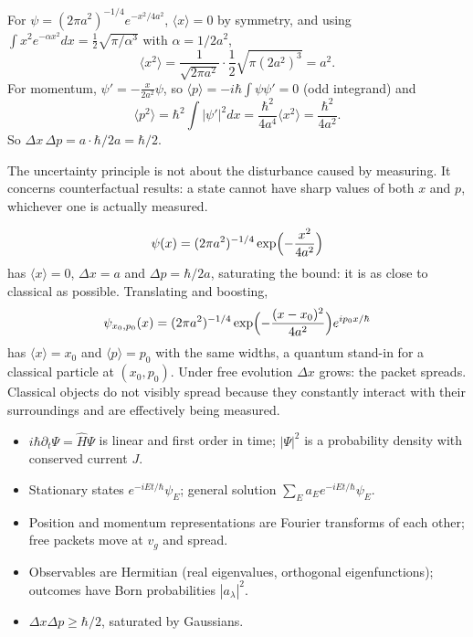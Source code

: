 \begin{example}
For $\psi = (2\pi a^2)^{-1/4}e^{-x^2/4a^2}$, $\langle x\rangle = 0$ by symmetry, and using $\int x^2e^{-\alpha x^2}dx = \frac12\sqrt{\pi/\alpha^3}$ with $\alpha = 1/2a^2$,
\[
    \langle x^2\rangle = \frac{1}{\sqrt{2\pi a^2}}\cdot\frac12\sqrt{\pi(2a^2)^3} = a^2 .
\]
For momentum, $\psi' = -\frac{x}{2a^2}\psi$, so $\langle p\rangle = -i\hbar\int\psi\psi' = 0$ (odd integrand) and
\[
    \langle p^2\rangle = \hbar^2\int|\psi'|^2dx = \frac{\hbar^2}{4a^4}\langle x^2\rangle = \frac{\hbar^2}{4a^2}.
\]
So $\Delta x\,\Delta p = a\cdot\hbar/2a = \hbar/2$.
\end{example}

The uncertainty principle is not about the disturbance caused by measuring. It concerns counterfactual results: a state cannot have sharp values of both $x$ and $p$, whichever one is actually measured.

\begin{example}
\[
    \psi(x) = (2\pi a^2)^{-1/4}\exp\Bigl(-\frac{x^2}{4a^2}\Bigr)
\]
has $\langle x\rangle = 0$, $\Delta x = a$ and $\Delta p = \hbar/2a$, saturating the bound: it is as close to classical as possible. Translating and boosting,
\[
    \psi_{x_0,p_0}(x) = (2\pi a^2)^{-1/4}\exp\Bigl(-\frac{(x-x_0)^2}{4a^2}\Bigr)e^{ip_0x/\hbar}
\]
has $\langle x\rangle = x_0$ and $\langle p\rangle = p_0$ with the same widths, a quantum stand-in for a classical particle at $(x_0,p_0)$. Under free evolution $\Delta x$ grows: the packet spreads. Classical objects do not visibly spread because they constantly interact with their surroundings and are effectively being measured.
\end{example}

\begin{fact}
\leavevmode
\begin{itemize}
\item $i\hbar\partial_t\Psi = \hat{H}\Psi$ is linear and first order in time; $|\Psi|^2$ is a probability density with conserved current $J$.
\item Stationary states $e^{-iEt/\hbar}\psi_E$; general solution $\sum_Ea_Ee^{-iEt/\hbar}\psi_E$.
\item Position and momentum representations are Fourier transforms of each other; free packets move at $v_g$ and spread.
\item Observables are Hermitian (real eigenvalues, orthogonal eigenfunctions); outcomes have Born probabilities $|a_\lambda|^2$.
\item $\Delta x\Delta p\ge\hbar/2$, saturated by Gaussians.
\end{itemize}
\end{fact}
